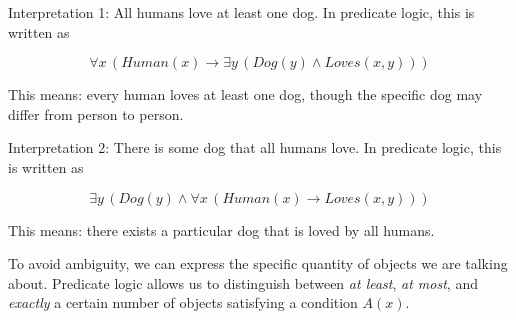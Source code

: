 \documentclass[12pt,a4paper,openany]{article}
\begin{document}
Interpretation 1: All humans love at least one dog. In predicate logic, this is written as

\[
\forall x \, (Human(x) \to \exists y \, (Dog(y) \land Loves(x,y)))
\]

This means: every human loves at least one dog, though the specific dog
may differ from person to person.

Interpretation 2: There is some dog that all humans love. In predicate logic, this is
written as

\[
\exists y \, (Dog(y) \land \forall x \, (Human(x) \to Loves(x,y)))
\]

This means: there exists a particular dog that is loved by all humans.

To avoid ambiguity, we can express the specific quantity of objects we
are talking about. Predicate logic allows us to distinguish between
\emph{at least}, \emph{at most}, and \emph{exactly} a certain number of
objects satisfying a condition \(A(x)\).
\end{document}
